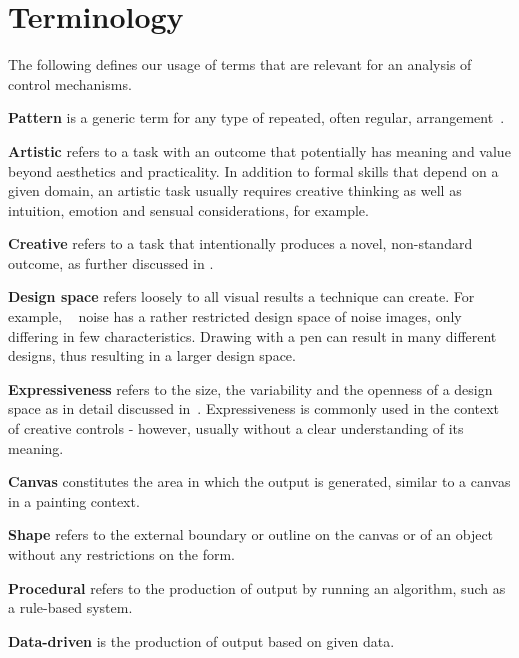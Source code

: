 
\section{Terminology}\label{terminology}
The following defines our usage of terms that are relevant for an analysis of control mechanisms. 

\textbf{Pattern} is a generic term for any type of repeated, often regular, arrangement~\cite{oed_2017}.


\textbf{Artistic} refers to a task with an outcome that potentially has meaning and value beyond aesthetics and practicality. In addition to formal skills that depend on a given domain, an artistic task usually requires creative thinking as well as intuition, emotion and sensual considerations, for example.

\textbf{Creative} refers to a task that intentionally produces a novel, non-standard outcome, as further discussed in . 

\textbf{Design space} refers loosely to all visual results a technique can create. For example, \citeauthor*{perlin_1985_ais}~\cite{perlin_1985_ais} noise has a rather restricted design space of noise images, only differing in few characteristics. Drawing with a pen can result in many different designs, thus resulting in a larger design space.

\textbf{Expressiveness} refers to the size, the variability and the openness of a design space as in detail discussed in~. Expressiveness is commonly used in the context of creative controls - however, usually without a clear understanding of its meaning.

\textbf{Canvas} constitutes the area in which the output is generated, similar to a canvas in a painting context.

\textbf{Shape} refers to the external boundary or outline on the canvas or of an object without any restrictions on the form. 

\textbf{Procedural} refers to the production of output by running an algorithm, such as a rule-based system.

\textbf{Data-driven} is the production of output based on given data.



